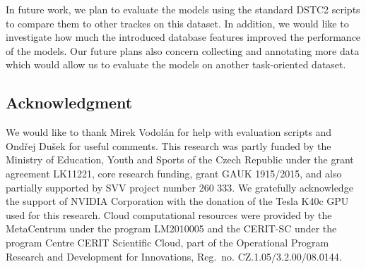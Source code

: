 \documentclass{itatnew}
\def\PB#1{\textcolor{red}{PB: \textit{#1}}}
\begin{document}
In future work, we plan to evaluate the models using the standard DSTC2 scripts to compare them to other trackes on this dataset.
In addition, we would like to investigate how much the introduced database features improved the performance of the models.
Our future plans also concern collecting and annotating more data which would allow us to evaluate the models on another task-oriented dataset.

\subsection*{Acknowledgment}
We would like to thank Mirek Vodolán for help with evaluation scripts and Ondřej Dušek for useful comments.
This research was partly funded by the Ministry of Education, Youth and Sports of the Czech Republic under the grant agreement LK11221, core research funding, grant GAUK 1915/2015, and also partially supported by SVV project number 260 333. 
We gratefully acknowledge the support of NVIDIA Corporation with the donation of the Tesla K40c GPU used for this research.
Cloud computational resources were provided by the MetaCentrum under the program LM2010005 and the CERIT-SC under the program Centre CERIT Scientific Cloud, part of the Operational Program Research and Development for Innovations, Reg.\ no. CZ.1.05/3.2.00/08.0144.

\newpage


\end{document}
